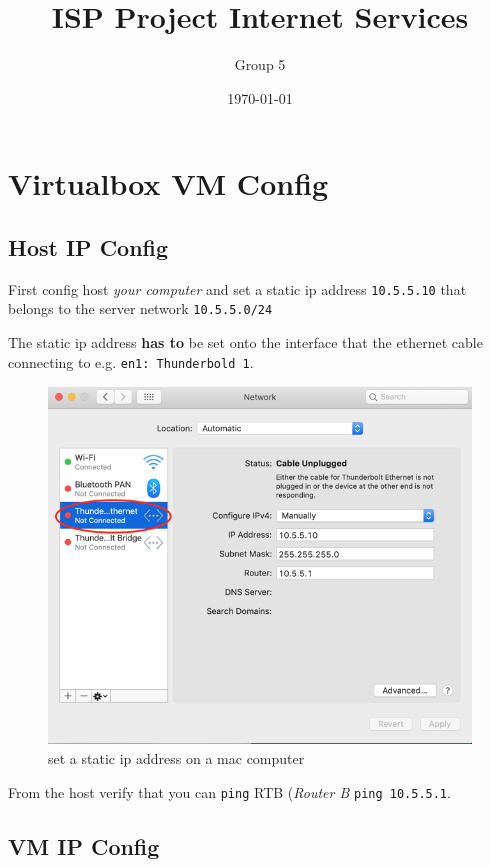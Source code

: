 \documentclass[11pt]{article}
\author{Group 5}
\date{\today}
\title{ISP Project Internet Services}
\begin{document}
\maketitle
\setlength\parindent{0pt}

\section{Virtualbox VM Config}
\label{sec:orga77be60}

\subsection{Host IP Config}
\label{sec:org7fc3342}

First config host \emph{your computer} and set a static ip address \texttt{10.5.5.10} that belongs to the server network \texttt{10.5.5.0/24}

The static ip address \textbf{has to} be set onto the interface that the ethernet cable connecting to e.g. \texttt{en1: Thunderbold 1}.

\begin{figure}[htbp]
\centering
\includegraphics[width=.9\linewidth]{./img/host.png}
\caption{set a static ip address on a mac computer}
\end{figure}

From the host verify that you can \texttt{ping} RTB (\emph{Router B} \texttt{ping 10.5.5.1}.

\subsection{VM IP Config}
\label{sec:orgdaedea8}
\end{document}
